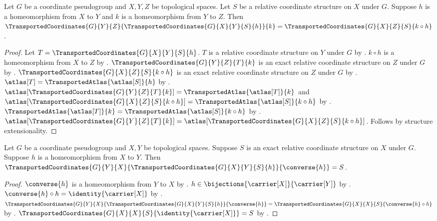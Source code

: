 \begin{theorem}\label{transported_coordinates_composition}
    Let $G$ be a coordinate pseudogroup and $X,Y,Z$ be topological spaces.
    Let $S$ be a relative coordinate structure on $X$ under $G$.
    Suppose $h$ is a homeomorphism from $X$ to $Y$ and $k$ is a homeomorphism from $Y$ to $Z$.
    Then $\TransportedCoordinates{G}{Y}{Z}{\TransportedCoordinates{G}{X}{Y}{S}{h}}{k}
        =\TransportedCoordinates{G}{X}{Z}{S}{k\circ h}$.
\end{theorem}
\begin{proof}
    Let $T=\TransportedCoordinates{G}{X}{Y}{S}{h}$.
    $T$ is a relative coordinate structure on $Y$ under $G$ by .
    $k\circ h$ is a homeomorphism from $X$ to $Z$ by .
    $\TransportedCoordinates{G}{Y}{Z}{T}{k}$ is an exact relative coordinate structure
        on $Z$ under $G$ by .
    $\TransportedCoordinates{G}{X}{Z}{S}{k\circ h}$ is an exact relative coordinate structure
        on $Z$ under $G$ by .
    $\atlas[T]=\TransportedAtlas{\atlas[S]}{h}$ by .
    $\atlas[\TransportedCoordinates{G}{Y}{Z}{T}{k}]=\TransportedAtlas{\atlas[T]}{k}$ and
        $\atlas[\TransportedCoordinates{G}{X}{Z}{S}{k\circ h}]=\TransportedAtlas{\atlas[S]}{k\circ h}$ by
        .
    $\TransportedAtlas{\atlas[T]}{k}=\TransportedAtlas{\atlas[S]}{k\circ h}$ by
        .
    $\atlas[\TransportedCoordinates{G}{Y}{Z}{T}{k}]
        =\atlas[\TransportedCoordinates{G}{X}{Z}{S}{k\circ h}]$.
    Follows by structure extensionality.
\end{proof}

\begin{theorem}\label{transported_coordinates_roundtrip}
    Let $G$ be a coordinate pseudogroup and $X,Y$ be topological spaces.
    Suppose $S$ is an exact relative coordinate structure on $X$ under $G$.
    Suppose $h$ is a homeomorphism from $X$ to $Y$.
    Then $\TransportedCoordinates{G}{Y}{X}{\TransportedCoordinates{G}{X}{Y}{S}{h}}{\converse{h}}=S$.
\end{theorem}
\begin{proof}
    $\converse{h}$ is a homeomorphism from $Y$ to $X$ by .
    $h\in\bijections{\carrier[X]}{\carrier[Y]}$ by .
    $\converse{h}\circ h=\identity{\carrier[X]}$ by .
    $\TransportedCoordinates{G}{Y}{X}{\TransportedCoordinates{G}{X}{Y}{S}{h}}{\converse{h}}
        =\TransportedCoordinates{G}{X}{X}{S}{\converse{h}\circ h}$ by
        .
    $\TransportedCoordinates{G}{X}{X}{S}{\identity{\carrier[X]}}=S$ by
        .
\end{proof}

